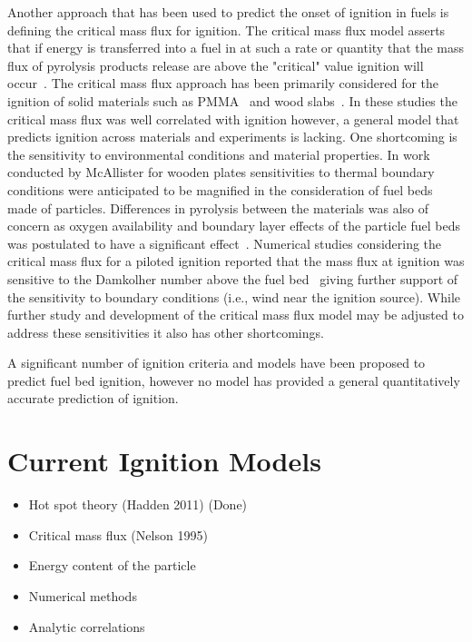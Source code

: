     Another approach that has been used to predict the onset of ignition in fuels is defining the critical mass flux for ignition. The critical mass flux model asserts that if energy is transferred into a fuel in at such a rate or quantity that the mass flux of pyrolysis products release are above the "critical" value ignition will occur~\cite{Nelson1995}. The critical mass flux approach has been primarily considered for the ignition of solid materials such as PMMA~\cite{Rich2007} and wood slabs~\cite{Yashwanth2015, McAllister2013}. In these studies the critical mass flux was well correlated with ignition however, a general model that predicts ignition across materials and experiments is lacking. One shortcoming is the sensitivity to environmental conditions and material properties. In work conducted by McAllister for wooden plates sensitivities to thermal boundary conditions were anticipated to be magnified in the consideration of fuel beds made of particles. Differences in pyrolysis between the materials was also of concern as oxygen availability and boundary layer effects of the particle fuel beds was postulated to have a significant effect~\cite{McAllister2013}.  Numerical studies considering the critical mass flux for a piloted ignition reported that the mass flux at ignition was sensitive to the Damkolher number above the fuel bed~\cite{Dai2013} giving further support of the sensitivity to boundary conditions (i.e., wind near the ignition source). While further study and development of the critical mass flux model may be adjusted to address these sensitivities it also has other shortcomings. 
    
    A significant number of ignition criteria and models have been proposed to predict fuel bed ignition, however no model has provided a general quantitatively accurate prediction of ignition. 
    \section{Current Ignition Models}
        \begin{itemize}
            \item Hot spot theory (Hadden 2011) (Done)
            \item Critical mass flux (Nelson 1995)
            \item Energy content of the particle
            \item Numerical methods
            \item Analytic correlations
        \end{itemize}
    
